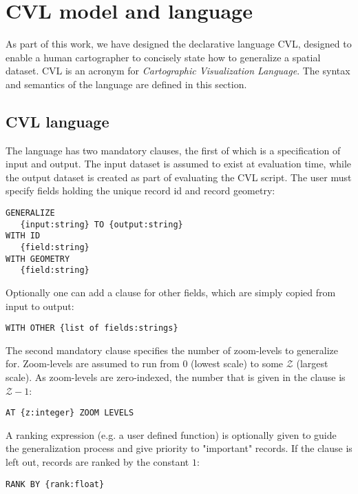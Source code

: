 \section{CVL model and language}

As part of this work, we have designed the declarative language CVL, designed to enable a human cartographer to concisely state how to generalize a spatial dataset. CVL is an acronym for \emph{Cartographic Visualization Language}. The syntax and semantics of the language are defined in this section.

\subsection{CVL language}

The language has two mandatory clauses, the first of which is a specification of input and output. The input dataset is assumed to exist at evaluation time, while the output dataset is created as part of evaluating the CVL script. The user must specify fields holding the unique record id and record geometry: 

\begin{lstlisting}
GENERALIZE 
   {input:string} TO {output:string}
WITH ID
   {field:string}
WITH GEOMETRY 
   {field:string}
\end{lstlisting}

Optionally one can add a clause for other fields, which are simply copied from input to output:

\begin{lstlisting}
WITH OTHER {list of fields:strings}
\end{lstlisting}

The second mandatory clause specifies the number of zoom-levels to generalize for. Zoom-levels are assumed to run from 0 (lowest scale) to some $\mathcal{Z}$ (largest scale). As zoom-levels are zero-indexed, the number that is given in the clause is $\mathcal{Z}-1$:

\begin{lstlisting}
AT {z:integer} ZOOM LEVELS
\end{lstlisting}

A ranking expression (e.g. a user defined function) is optionally given to guide the generalization process and give priority to "important" records. If the clause is left out, records are ranked by the constant $1$:

\begin{lstlisting}
RANK BY {rank:float}
\end{lstlisting}

